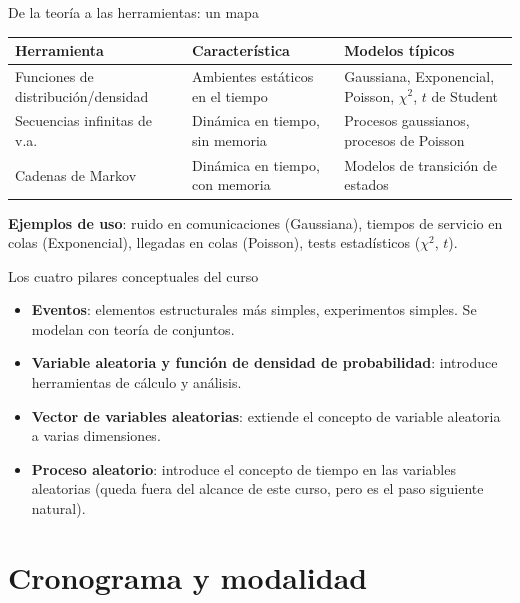 \documentclass[aspectratio=169,11pt]{beamer}
\begin{document}
\begin{frame}{De la teoría a las herramientas: un mapa}
\centering
\small
\begin{tabularx}{\textwidth}{@{}l l X@{}}
\toprule
\textbf{Herramienta} & \textbf{Característica} & \textbf{Modelos típicos} \\
\midrule
Funciones de distribución/densidad & Ambientes estáticos en el tiempo & Gaussiana, Exponencial, Poisson, $\chi^2$, $t$ de Student \\
Secuencias infinitas de v.a. & Dinámica en tiempo, sin memoria & Procesos gaussianos, procesos de Poisson \\
Cadenas de Markov & Dinámica en tiempo, con memoria & Modelos de transición de estados \\
\bottomrule
\end{tabularx}

\vspace{0.8em}
\footnotesize \textbf{Ejemplos de uso}: ruido en comunicaciones (Gaussiana), tiempos de servicio en colas (Exponencial), llegadas en colas (Poisson), tests estadísticos ($\chi^2$, $t$).
\end{frame}

\begin{frame}{Los cuatro pilares conceptuales del curso}
\begin{itemize}
\item \textbf{Eventos}: elementos estructurales más simples, experimentos simples. Se modelan con teoría de conjuntos.
\item \textbf{Variable aleatoria y función de densidad de probabilidad}: introduce herramientas de cálculo y análisis.
\item \textbf{Vector de variables aleatorias}: extiende el concepto de variable aleatoria a varias dimensiones.
\item \textbf{Proceso aleatorio}: introduce el concepto de tiempo en las variables aleatorias (queda fuera del alcance de este curso, pero es el paso siguiente natural).
\end{itemize}
\end{frame}

\section{Cronograma y modalidad}
\end{document}
